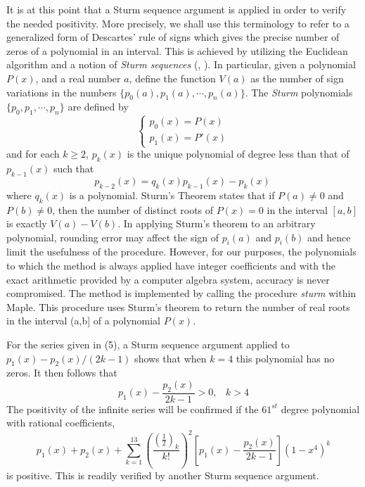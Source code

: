 \documentclass[12pt]{article}
\begin{document}
It is at this point that a Sturm sequence argument is applied in order to 
verify the needed
positivity. More precisely, we shall use this terminology to refer to a 
generalized form of Descartes'
rule of signs which gives the precise number of zeros of a polynomial in 
an interval.  This is
achieved by  utilizing the Euclidean algorithm and a notion of {\em Sturm 
sequences} (\cite{PH},
\cite{G}).   In particular, given a polynomial $P(x)$, and  a real number 
$a$, define the function
$V(a)$ as  the number of sign variations in the numbers $\{ p_0(a), 
p_1(a), \cdots, p_n(a)\}$.  The
{\em Sturm} polynomials $\{ p_0, p_1, \cdots, p_n\}$ are defined by 
$$
\left\{
\begin{array}{l} p_0(x)=P(x)\\ p_1(x)=P'(x)
\end{array}
\right.
$$ 
and for each $ k\geq 2$, $p_k(x)$ is the unique polynomial of degree less 
than that of $ p_{k-1}(x)$
such that 
$$ 
p_{k-2}(x) =q_k(x)p_{k-1}(x)-p_k(x)\
$$  
where $q_k(x)$ is a polynomial.  Sturm's Theorem states that if $P(a) 
\neq 0$ and $P(b) \neq 0$,  then
the number of distinct roots of $P(x)=0$ in the interval $[a,b]$ is 
exactly $V(a)-V(b)$.  In applying
Sturm's theorem to an arbitrary polynomial,  rounding error may affect 
the sign of $p_i(a)$ and
$p_i(b)$  and  hence limit  the usefulness of the procedure.  However, 
for our purposes, the
polynomials to which the method is always applied have integer 
coefficients and with the exact
arithmetic provided by a computer algebra system, accuracy is never 
compromised.  The method is
implemented by calling the procedure {\em sturm} within Maple. This 
procedure  uses Sturm's theorem to
return the number of real roots in the interval (a,b] of a  polynomial 
$P(x)$.

For the series given in (5), a Sturm sequence argument applied to 
$p_1(x)-p_2(x)/(2k-1) $ shows 
that when $k=4$ this polynomial has no zeros.  It then follows that
\begin{equation}
\displaystyle{ p_1(x) -\frac{p_2(x)}{2k-1}   > 0, \;\;\;  k >4} 
\end{equation} 
The positivity of the infinite series will be confirmed if the  
$61^{st}$ degree polynomial with rational coefficients, 
\begin{equation}
\displaystyle{ p_1(x) +p_2(x) +  \sum_{k=1}^{13} \left(\frac{( 
\frac{1}{2}) _k }{ k!}\right)^2 \left [
p_1(x)-\frac{p_2(x)}{2k-1} \right ] (1-x^4)^k  }
\end{equation} 
is positive.  This is readily verified by  another Sturm
sequence argument.
\end{document}
